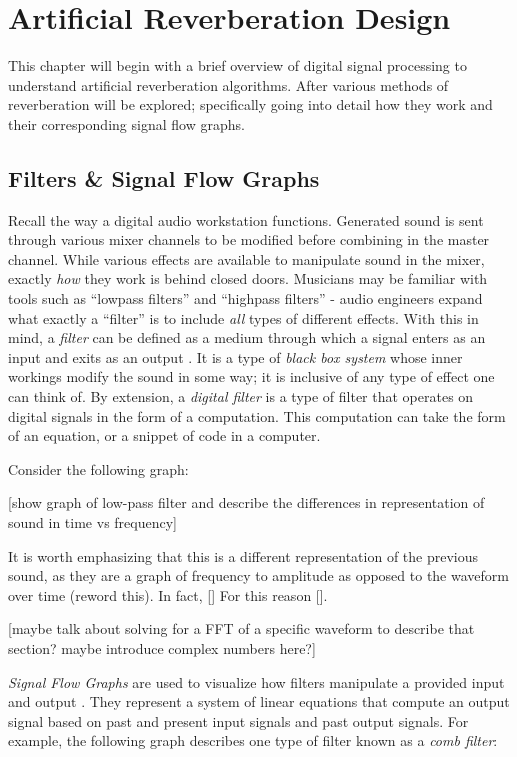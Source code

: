 \chapter{Artificial Reverberation Design}
\hspace*{-0.15cm}This chapter will begin with a brief overview of digital signal processing to understand artificial reverberation algorithms. After various methods of reverberation will be explored; specifically going into detail how they work and their corresponding signal flow graphs.

\section{Filters \& Signal Flow Graphs}
Recall the way a digital audio workstation functions. Generated sound is sent through various mixer channels to be modified before combining in the master channel. While various effects are available to manipulate sound in the mixer, exactly \textit{how} they work is behind closed doors. Musicians may be familiar with tools such as ``lowpass filters'' and ``highpass filters'' - audio engineers expand what exactly a ``filter'' is to include \textit{all} types of different effects. With this in mind, a \textit{filter} can be defined as a medium through which a signal enters as an input and exits as an output \cite{FILTERS07}. It is a type of \textit{black box system} whose inner workings modify the sound in some way; it is inclusive of any type of effect one can think of. By extension, a \textit{digital filter} is a type of filter that operates on digital signals in the form of a computation. This computation can take the form of an equation, or a snippet of code in a computer.

Consider the following graph:

[show graph of low-pass filter and describe the differences in representation of sound in time vs frequency]

It is worth emphasizing that this is a different representation of the previous sound, as they are a graph of frequency to amplitude as opposed to the waveform over time (reword this). In fact, [] For this reason [].

[maybe talk about solving for a FFT of a specific waveform to describe that section? maybe introduce complex numbers here?]

\textit{Signal Flow Graphs} are used to visualize how filters manipulate a provided input and output \cite{FILTERS07}. They represent a system of linear equations that compute an output signal based on past and present input signals and past output signals. For example, the following graph describes one type of filter known as a \textit{comb filter}:

